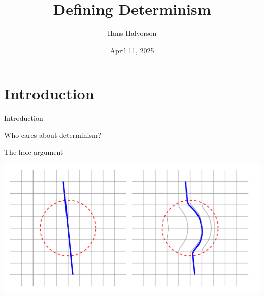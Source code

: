 \documentclass[fleqn]{beamer}
\title{Defining Determinism}
\subtitle{}
\author{Hans Halvorson}
\institute{Princeton University}
\date{April 11, 2025}
\begin{document}
\begin{frame}
  \titlepage
\end{frame}

\section{Introduction}

\begin{frame}{Introduction}


  {\Huge
    Who cares about determinism? }


\end{frame}

\begin{frame}{The hole argument}

  \includegraphics[scale=0.8]{hole.pdf}


\end{frame}
\end{document}

